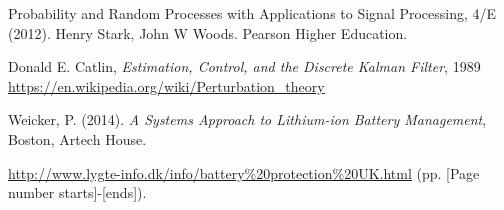 \begin{thebibliography}{9}
Probability and Random Processes with Applications to Signal Processing, 4/E (2012). 
Henry Stark, John W Woods. Pearson Higher Education. 

	Donald E. Catlin, \emph{Estimation, Control, and the Discrete Kalman Filter}, 1989
  \url{https://en.wikipedia.org/wiki/Perturbation_theory}

Weicker, P. (2014). \emph{A Systems Approach to Lithium-ion Battery Management}, Boston, Artech House. 





  \url{http://www.lygte-info.dk/info/battery%20protection%20UK.html}
(pp. [Page number starts]-[ends]).

\end{thebibliography}
